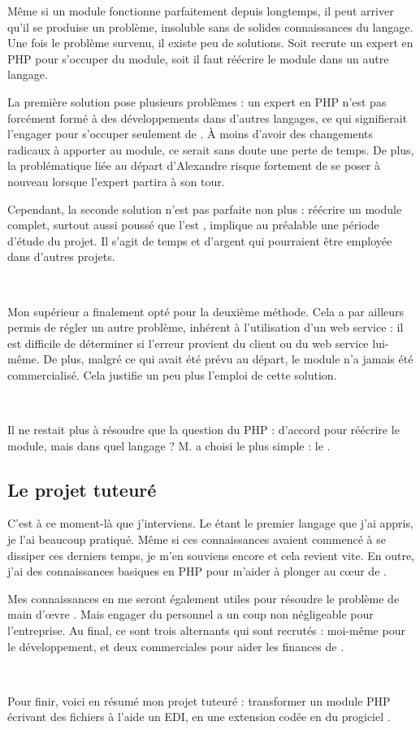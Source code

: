 Même si un module fonctionne parfaitement depuis longtemps, il peut arriver qu'il se produise un problème, insoluble sans de solides connaissances du langage. Une fois le problème survenu, il existe peu de solutions. Soit \solulog{} recrute un expert en PHP pour s'occuper du module, soit il faut réécrire le module dans un autre langage.

La première solution pose plusieurs problèmes : un expert en PHP n'est pas forcément formé à des développements dans d'autres langages, ce qui signifierait l'engager pour s'occuper seulement de \pireus. À moins d'avoir des changements radicaux à apporter au module, ce serait sans doute une perte de temps. De plus, la problématique liée au départ d'Alexandre risque fortement de se poser à nouveau lorsque l'expert partira à son tour.

Cependant, la seconde solution n'est pas parfaite non plus : réécrire un module complet, surtout aussi poussé que l'est \pireus{}, implique au préalable une période d'étude du projet. Il s'agit de temps et d'argent qui pourraient être employée dans d'autres projets.

~

Mon supérieur a finalement opté pour la deuxième méthode. Cela a par ailleurs permis de régler un autre problème, inhérent à l'utilisation d'un web service : il est difficile de déterminer si l'erreur provient du client ou du web service lui-même. De plus, malgré ce qui avait été prévu au départ, le module n'a jamais été commercialisé. Cela justifie un peu plus l'emploi de cette solution.

~

Il ne restait plus à résoudre que la question du PHP : d'accord pour réécrire le module, mais dans quel langage ? M.  a choisi le plus simple : le \vb.
\vfill


\subsection{Le projet tuteuré}
C'est à ce moment-là que j'interviens. Le \vb{} étant le premier langage que j'ai appris, je l'ai beaucoup pratiqué. Même si ces connaissances avaient commencé à se dissiper ces derniers temps, je m'en souviens encore et cela revient vite. En outre, j'ai des connaissances basiques en PHP pour m'aider à plonger au c\oe{ur} de \pireus.

Mes connaissances en \vb{} me seront également utiles pour résoudre le problème de \og main d'\oe{vre} \fg. Mais engager du personnel a un coup non négligeable pour l'entreprise. Au final, ce sont trois alternants qui sont recrutés : moi-même pour le développement, et deux commerciales pour aider les finances de \solulog.

~

Pour finir, voici en résumé mon projet tuteuré : transformer un module PHP écrivant des fichiers à l'aide un EDI, en une extension codée en \vb{} du progiciel \integrale{}.
